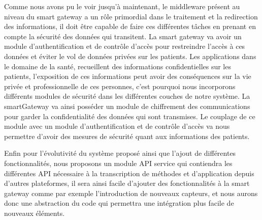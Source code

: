 Comme nous avons pu le voir jusqu’à maintenant, le middleware présent au niveau du smart gateway a un rôle primordial dans le traitement et la redirection des informations, il doit être capable de faire ces différentes tâches en prenant en compte la sécurité des données qui transitent. La smart gateway va avoir un module d’authentification et de contrôle d’accès pour restreindre l’accès à ces données et éviter le vol de données privées sur les patients. Les applications dans le domaine de la santé, recueillent des informations confidentielles sur les patients, l’exposition de ces informations peut avoir des conséquences sur la vie privée et professionnelle de ces personnes, c’est pourquoi nous incorporons différents modules de sécurité dans les différentes couches de notre système. La smartGateway va ainsi posséder un module de chiffrement des communications pour garder la confidentialité des données qui sont transmises. Le couplage de ce module avec un module d’authentification et de contrôle d’accès va nous permettre d’avoir des mesures de sécurité quant aux informations des patients.

Enfin pour l’évolutivité du système proposé ainsi que l’ajout de différentes fonctionnalités, nous proposons un module API service qui contiendra les différentes API nécessaire à la transcription de méthodes et d’application depuis d’autres plateformes, il sera ainsi facile d’ajouter des fonctionnalités à la smart gateway comme par exemple l’introduction de nouveaux capteurs, et nous aurons donc une abstraction du code qui permettra une intégration plus facile de nouveaux éléments.
